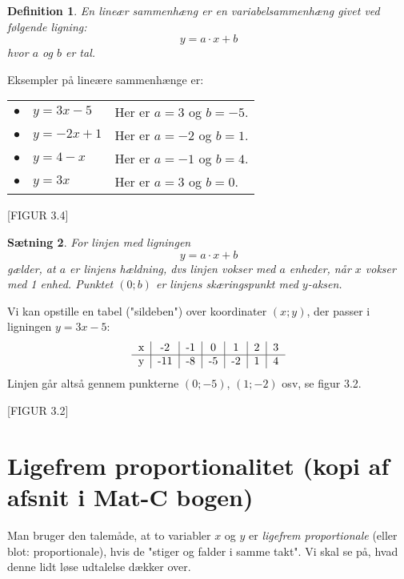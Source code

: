 \documentclass[12pt,oneside,a4paper]{article}
\newtheorem{thm}{Sætning}[section]
\newtheorem{mydef}[thm]{Definition}
\begin{document}
\begin{mydef}
    En lineær sammenhæng er en variabelsammenhæng givet ved følgende ligning:
    $$
    y = a\cdot x + b
    $$
    hvor $a$ og $b$ er tal.
\end{mydef}

Eksempler på lineære sammenhænge er:

\begin{tabular}{ll}
    $\bullet\quad y=3x-5$  & Her er $a=3$ og $b=-5$. \\
    $\bullet\quad y=-2x+1$ & Her er $a=-2$ og $b=1$. \\
    $\bullet\quad y=4-x$   & Her er $a=-1$ og $b=4$. \\
    $\bullet\quad y=3x$    & Her er $a=3$ og $b=0$.
\end{tabular}

[FIGUR 3.4]

\begin{thm}
    For linjen med ligningen
    $$
    y = a\cdot x + b
    $$
    gælder, at $a$ er linjens hældning, dvs linjen vokser med $a$ enheder, når $x$
    vokser med 1 enhed. Punktet $(0; b)$ er linjens skæringspunkt med $y$-aksen.
\end{thm}

Vi kan opstille en tabel ("sildeben") over koordinater $(x; y)$, der passer i
ligningen $y=3x-5$:
$$
\begin{tabular}{c|c|c|c|c|c|c}
    x &  -2 & -1 &  0 &  1 & 2 & 3 \\
    \hline
    y & -11 & -8 & -5 & -2 & 1 & 4
\end{tabular}
$$
Linjen går altså gennem punkterne $(0; -5)$, $(1; -2)$ osv, se figur 3.2.

[FIGUR 3.2]

\section{Ligefrem proportionalitet (kopi af afsnit i Mat-C bogen)}
Man bruger den talemåde, at to variabler $x$ og $y$ er {\em ligefrem
proportionale} (eller blot: proportionale), hvis de "stiger og falder i samme
takt". Vi skal se på, hvad denne lidt løse udtalelse dækker over.
\end{document}

